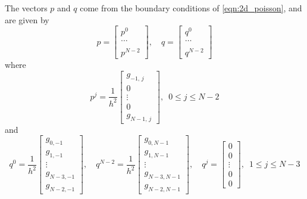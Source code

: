The vectors $p$ and $q$ come from the boundary conditions of \eqref{eqn:2d_poisson}, and are given by 
\[p = \begin{bmatrix} p^0 \\ \ldots \\ \\ p^{N-2} \end{bmatrix}, \quad  q = \begin{bmatrix} q^0 \\ \ldots \\ \\ q^{N-2} \end{bmatrix}\]
where 
\[p^j = \frac{1}{h^2} \begin{bmatrix} g_{-1,\,j} \\ 0 \\ \vdots \\0\\ g_{N-1,\,j} \end{bmatrix} ,\,\,\, 0 \leq j \leq N-2\]
and 
\[q^0 = \frac{1}{h^2}\begin{bmatrix} g_{0,-1}  \\ g_{1,-1} \\ \vdots \\ g_{N-3,-1}\\ g_{N-2,-1} \end{bmatrix}, \quad q^{N-2} = \frac{1}{h^2}\begin{bmatrix} g_{0,N-1} \\ g_{1,N-1} \\ \vdots \\ g_{N-3,N-1}\\ g_{N-2,N-1} \end{bmatrix}, \quad q^{j} = \begin{bmatrix} 0 \\ 0 \\ \vdots \\ 0 \\ 0 \end{bmatrix} ,\,\,\, 1 \leq j \leq N-3\]


